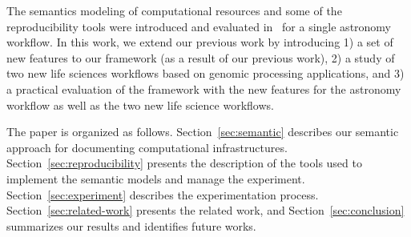 
The semantics modeling of computational resources and some of the reproducibility tools 
were introduced and evaluated in~\cite{SantanaPerez-REPPAR-2014} for a single astronomy  
workflow. In this work, we extend our previous work by introducing 1) a set 
of new features to our framework (as a result of our previous work), 2) a study of two new life 
sciences workflows based on genomic processing applications, and 3) a practical evaluation 
of the framework with the new features for the astronomy workflow as well as the two new 
life science workflows. 

The paper is organized as follows. Section~\ref{sec:semantic} describes our semantic approach 
for documenting computational infrastructures. Section~\ref{sec:reproducibility} presents the 
description of the tools used to implement the semantic models and manage the experiment. 
Section~\ref{sec:experiment} describes the experimentation process. Section~\ref{sec:related-work} 
presents the related work, and Section~\ref{sec:conclusion} summarizes our results and 
identifies future works.


